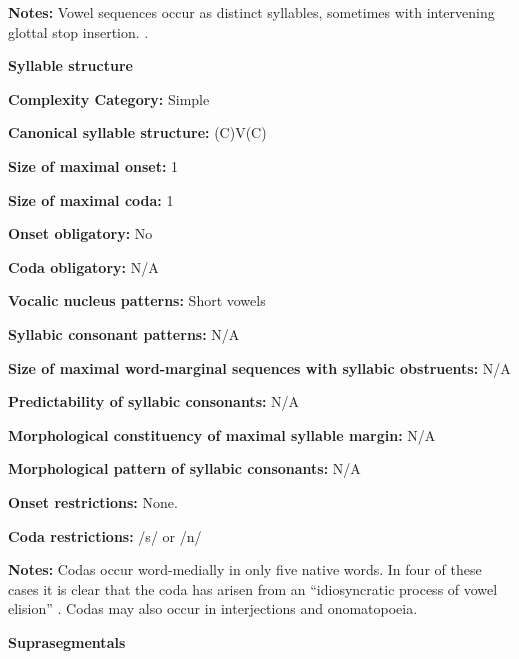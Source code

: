 \textbf{Notes:} Vowel sequences occur as distinct syllables, sometimes with intervening glottal stop insertion. \citep[28-9]{Guillaume2008}.



\textbf{Syllable structure}



\textbf{Complexity Category:} Simple



\textbf{Canonical syllable structure:} (C)V(C) \citep[30-32]{Guillaume2008}



\textbf{Size of maximal onset:} 1



\textbf{Size of maximal coda:} 1



\textbf{Onset obligatory:} No



\textbf{Coda obligatory:} N/A



\textbf{Vocalic nucleus patterns:} Short vowels



\textbf{Syllabic consonant patterns:} N/A



\textbf{Size of maximal word{}-marginal sequences with syllabic obstruents:} N/A



\textbf{Predictability of syllabic consonants:} N/A



\textbf{Morphological constituency of maximal syllable margin:} N/A



\textbf{Morphological pattern of syllabic consonants:} N/A



\textbf{Onset restrictions:} None.



\textbf{Coda restrictions:} /s/ or /n/



\textbf{Notes:} Codas occur word-medially in only five native words. In four of these cases it is clear that the coda has arisen from an “idiosyncratic process of vowel elision” \citep[31]{Guillaume2008}. Codas may also occur in interjections and onomatopoeia.



\textbf{Suprasegmentals}



